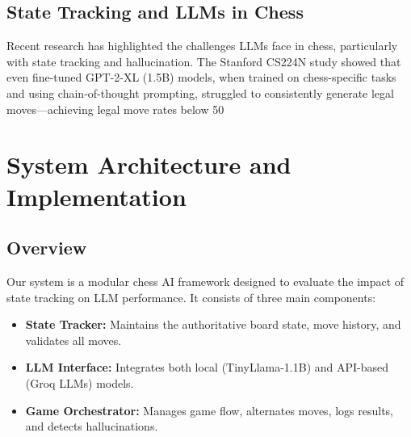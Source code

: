\documentclass[conference]{IEEEtran}
\begin{document}
\subsection{State Tracking and LLMs in Chess}
Recent research has highlighted the challenges LLMs face in chess, particularly with state tracking and hallucination. The Stanford CS224N study \cite{stanford_gpt2_chess} showed that even fine-tuned GPT-2-XL (1.5B) models, when trained on chess-specific tasks and using chain-of-thought prompting, struggled to consistently generate legal moves—achieving legal move rates below 50%

\section{System Architecture and Implementation}
\subsection{Overview}
Our system is a modular chess AI framework designed to evaluate the impact of state tracking on LLM performance. It consists of three main components:
\begin{itemize}
    \item \textbf{State Tracker:} Maintains the authoritative board state, move history, and validates all moves.
    \item \textbf{LLM Interface:} Integrates both local (TinyLlama-1.1B) and API-based (Groq LLMs) models.
    \item \textbf{Game Orchestrator:} Manages game flow, alternates moves, logs results, and detects hallucinations.
\end{itemize}
\end{document}
